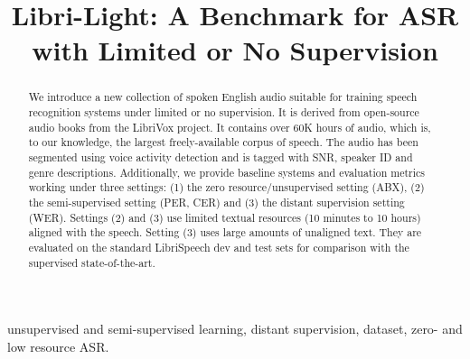 \documentclass{article}
\title{Libri-Light: A Benchmark for ASR with Limited or No Supervision}
\begin{document}
\maketitle

\begin{abstract}
We introduce a new collection of spoken English audio suitable for training speech recognition systems under limited or no supervision. It is derived from open-source audio books from the LibriVox project. It contains over 60K hours of audio, which is, to our knowledge, the largest freely-available corpus of speech. The audio has been segmented using voice activity detection and is tagged with SNR, speaker ID and genre descriptions. Additionally, we provide baseline systems and evaluation metrics working under three settings: (1) the zero resource/unsupervised setting (ABX), (2) the semi-supervised setting (PER, CER) and (3) the distant supervision setting (WER). Settings (2) and (3) use limited textual resources (10 minutes to 10 hours) aligned with the speech. Setting (3) uses large amounts of unaligned text. They are evaluated on the standard LibriSpeech dev and test sets for comparison with the supervised state-of-the-art.  
\end{abstract}

\begin{keywords}
unsupervised and semi-supervised learning, distant supervision, dataset, zero- and low resource ASR. 
\end{keywords}
\end{document}
